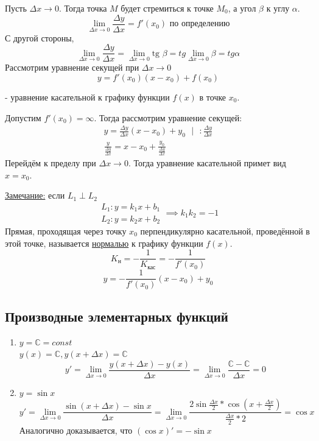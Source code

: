 \documentclass[12pt]{article}
\begin{document}
    Пусть $\Delta x \to 0$. Тогда точка $M$ будет стремиться к точке $M_0$, а угол $\beta$ к углу $\alpha$.
    \[ \lim_{\Delta x \to 0} \frac{\Delta y}{\Delta x} = f'(x_0) \text{ по определению} \]
    С другой стороны,
    \[ \lim_{\Delta x \to 0} \frac{\Delta y}{\Delta x} = \lim_{\Delta x \to 0} \text{tg } \beta = tg \lim_{\Delta x \to 0} \beta = tg \alpha \]
    Рассмотрим уравнение секущей при $\Delta x \to 0$
    \[ y = f'(x_0)(x - x_0) + f(x_0) \]
    \begin{center}
        - уравнение касательной к графику функции $f(x)$ в точке $x_0$.
    \end{center}

    Допустим $f'(x_0) = \infty$. Тогда рассмотрим уравнение секущей:
    \begin{gather*}
        y = \frac{\Delta y}{\Delta x} (x-x_0) + y_0 \text{ } \big| \text{ } : \frac{\Delta y}{\Delta x}\\
        \frac{y}{\frac{\Delta y}{\Delta x}} = x - x_0 + \frac{y_0}{\frac{\Delta y}{\Delta x}}
    \end{gather*}
    Перейдём к пределу при $\Delta x \to 0$. Тогда уравнение касательной примет вид \underline{$x = x_0$}.\par\noindent
    \underline{Замечание:} если $L_1 \perp L_2$
    \[ \begin{matrix}
        L_1: y = k_1x + b_1\\
        L_2: y = k_2x + b_2
    \end{matrix} \implies k_1k_2 = -1 \]
    Прямая, проходящая через точку $x_0$ перпендикулярно касательной, проведённой в этой точке, называется \underline{нормалью} к графику функции $f(x)$.
    \[ K_\text{н} = -\frac{1}{K_\text{кас}} = -\frac{1}{f'(x_0)} \]
    \[ y = -\frac{1}{f'(x_0)}(x - x_0) + y_0 \]

    \subsection{Производные элементарных функций}
    \begin{enumerate}
        \item $y = \mathbb{C} = const$\\
        $y(x) = \mathbb{C}, y(x + \Delta x) = \mathbb{C}$
        \[ y' = \lim_{\Delta x \to 0}\frac{y(x+ \Delta x) - y(x)}{\Delta x} = \lim_{\Delta x \to 0}\frac{\mathbb{C} - \mathbb{C}}{\Delta x} = 0 \]
        \item $y = \sin x$
        \[ y' = \lim_{\Delta x \to 0} \frac{\sin(x + \Delta x) - \sin x}{\Delta x} = \lim_{\Delta x \to 0}\frac{2\sin \frac{\Delta x}{2} * \cos (x + \frac{\Delta x}{2})}{\frac{\Delta x}{2} * 2} = \cos x \]
        Аналогично доказывается, что $(\cos x)' = - \sin x$
    \end{enumerate}
\end{document}
